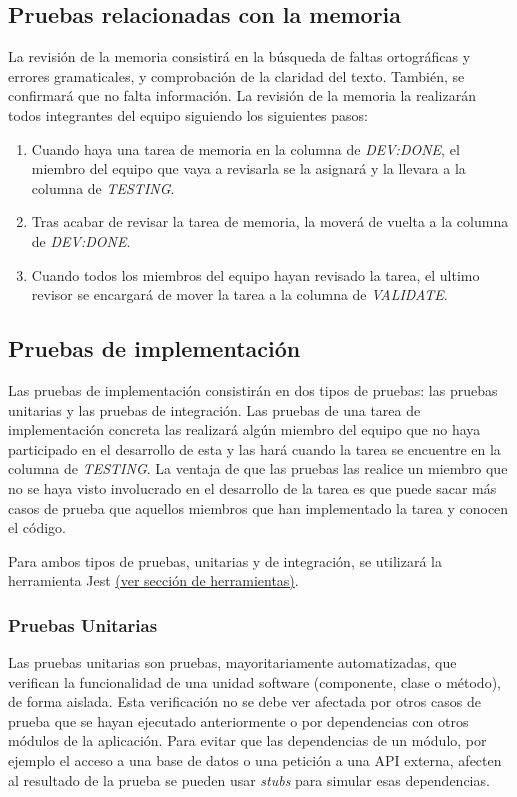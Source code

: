 \subsection{Pruebas relacionadas con la memoria}
La revisión de la memoria consistirá en la búsqueda de faltas ortográficas y errores gramaticales, y comprobación de la claridad del texto. También, se confirmará que no falta información.
La revisión de la memoria la realizarán todos integrantes del equipo siguiendo los siguientes pasos:
\begin{enumerate}
    \item Cuando haya una tarea de memoria en la columna de \textit{DEV:DONE}, el miembro del equipo que vaya a revisarla se la asignará y la llevara a la columna de \textit{TESTING}.
    \item Tras acabar de revisar la tarea de memoria, la moverá de vuelta a la columna de \textit{DEV:DONE}.
    \item Cuando todos los miembros del equipo hayan revisado la tarea, el ultimo revisor se encargará de mover la tarea a la columna de \textit{VALIDATE}.
\end{enumerate}
\subsection{Pruebas de implementación}
Las pruebas de implementación consistirán en dos tipos de pruebas: las pruebas unitarias y las pruebas de integración. Las pruebas de una tarea de implementación concreta las realizará algún miembro del equipo que no haya participado en el desarrollo de esta y las hará cuando la tarea se encuentre en la columna de \textit{TESTING}. La ventaja de que las pruebas las realice un miembro que no se haya visto involucrado en el desarrollo de la tarea es que puede sacar más casos de prueba que aquellos miembros que han implementado la tarea y conocen el código.

Para ambos tipos de pruebas, unitarias y de integración, se utilizará la herramienta Jest \underline{(ver sección de herramientas)}.
\subsubsection{Pruebas Unitarias}
Las pruebas unitarias son pruebas, mayoritariamente automatizadas, que verifican la funcionalidad de una unidad software (componente, clase o método), de forma aislada. Esta verificación no se debe ver afectada por otros casos de prueba que se hayan ejecutado anteriormente o por dependencias con otros módulos de la aplicación. Para evitar que las dependencias de un módulo, por ejemplo el acceso a una base de datos o una petición a una API externa, afecten al resultado de la prueba se pueden usar \textit{stubs} para simular esas dependencias.

